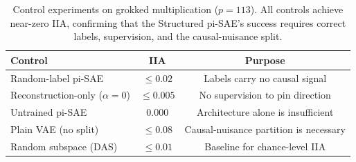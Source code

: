 \vspace{0.5em}
\begin{table}[H]
\centering
\small
\begin{tabular}{lcc}
\toprule
\textbf{Control} & \textbf{IIA} & \textbf{Purpose} \\
\midrule
Random-label pi-SAE    & $\leq 0.02$  & Labels carry no causal signal \\
Reconstruction-only ($\alpha{=}0$) & $\leq 0.005$ & No supervision to pin direction \\
Untrained pi-SAE       & 0.000        & Architecture alone is insufficient \\
Plain VAE (no split)   & $\leq 0.08$  & Causal-nuisance partition is necessary \\
Random subspace (DAS)  & $\leq 0.01$  & Baseline for chance-level IIA \\
\bottomrule
\end{tabular}
\caption{Control experiments on grokked multiplication ($p = 113$).
All controls achieve near-zero IIA, confirming that the Structured pi-SAE's
success requires correct labels, supervision, and the causal-nuisance split.}
\label{tab:controls}
\end{table}
